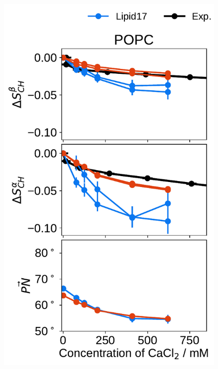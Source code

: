 \documentclass[journal=jpcbfk,manuscript=article]{achemso}
\newlength{\figheight}
\begin{document}
\begin{figure}[tbp!] 
  \centering 
  \includegraphics[height=\figheight]{../img/ecc_pops/order_parameters_changes_ecc-lip_L14_A-B-PN-COO_POPC_cacl.pdf} 

\end{figure}
\end{document}
